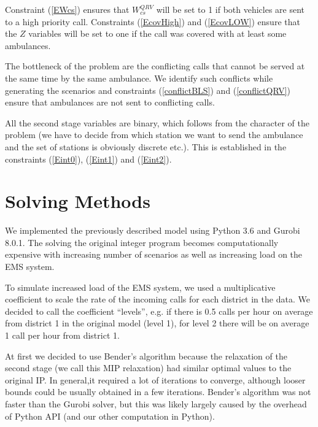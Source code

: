 \documentclass[12pt]{report}
\begin{document}
Constraint (\ref{EWcs}) ensures that $W_{cs}^{QRV}$ will be set to 1 if both vehicles are sent to a high priority call.
Constraints (\ref{EcovHigh}) and (\ref{EcovLOW}) ensure that the $Z$ variables will be set to one if the call was covered with at least some ambulances.

The bottleneck of the problem are the conflicting calls that cannot be served at the same time by the same ambulance. 
We identify such conflicts while generating the scenarios and constraints (\ref{conflictBLS}) and (\ref{conflictQRV}) ensure that ambulances are not sent to conflicting calls.

All the second stage variables are binary, which follows from the character of the problem (we have to decide from which station we want to send the ambulance and the set of stations is obviously discrete etc.).
This is established in the constraints (\ref{Eint0}), (\ref{Eint1}) and (\ref{Eint2}).


\newpage
\section*{Solving Methods}

We implemented the previously described model using Python 3.6 and Gurobi 8.0.1.
The solving the original integer program becomes computationally expensive with increasing number of scenarios as well as increasing load on the EMS system.

To simulate increased load of the EMS system, we used a multiplicative coefficient to scale the rate of the incoming calls for each district in the data.
We decided to call the coefficient ``levels'', e.g. if there is 0.5 calls per hour on average from district 1 in the original model (level 1), for level 2 there will be on average 1 call per hour from district 1.

At first we decided to use Bender's algorithm because the relaxation of the second stage (we call this MIP relaxation) had similar optimal values to the original IP.
In general,it required a lot of iterations to converge, although looser bounds could be usually obtained in a few iterations.
Bender's algorithm was not faster than the Gurobi solver, but this was likely largely caused by the overhead of Python API (and our other computation in Python).
\end{document}
